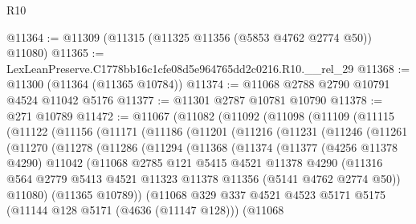 \begin{lexlean}{R10}
\begin{coremodule}
@11364 := @11309 (@11315 (@11325 @11356 (@5853 @4762 @2774 @50)) @11080)
@11365 := LexLeanPreserve.C1778bb16c1cfe08d5e964765dd2c0216.R10.__rel_29
@11368 := @11300 (@11364 (@11365 @10784))
@11374 := @11068 @2788 @2790 @10791 @4524 @11042 @5176
@11377 := @11301 @2787 @10781 @10790
@11378 := @271 @10789
@11472 := @11067
    (@11082
      (@11092
        (@11098
          (@11109
            (@11115
              (@11122
                (@11156
                  (@11171
                    (@11186
                      (@11201
                        (@11216
                          (@11231
                            (@11246
                              (@11261
                                (@11270
                                  (@11278
                                    (@11286
                                      (@11294
                                        (@11368
                                          (@11374
                                            (@11377
                                              (@4256 @11378 @4290)
                                              @11042
                                              (@11068
                                                @2785
                                                @121
                                                @5415
                                                @4521
                                                @11378
                                                @4290
                                                (@11316
                                                  @564
                                                  @2779
                                                  @5413
                                                  @4521
                                                  @11323
                                                  @11378
                                                  @11356
                                                  (@5141 @4762 @2774 @50))
                                                @11080)
                                              (@11365 @10789))
                                            (@11068
                                              @329
                                              @337
                                              @4521
                                              @4523
                                              @5171
                                              @5175
                                              (@11144 @128 @5171 (@4636 (@11147 @128)))
                                              (@11068

\end{coremodule}
\end{lexlean}
